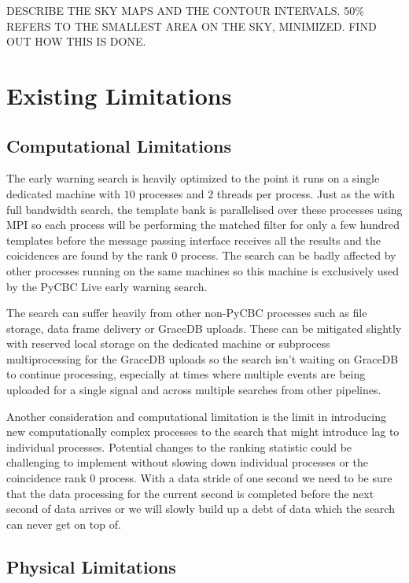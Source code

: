 DESCRIBE THE SKY MAPS AND THE CONTOUR INTERVALS. 50\% REFERS TO THE SMALLEST AREA ON THE SKY, MINIMIZED. FIND OUT HOW THIS IS DONE. 

\section{Existing Limitations}

\subsection{Computational Limitations}

The early warning search is heavily optimized to the point it runs on a single dedicated machine with $10$ processes and $2$ threads per process. Just as the with full bandwidth search, the template bank is parallelised over these processes using MPI so each process will be performing the matched filter for only a few hundred templates before the message passing interface receives all the results and the coicidences are found by the rank 0 process. The search can be badly affected by other processes running on the same machines so this machine is exclusively used by the PyCBC Live early warning search.

The search can suffer heavily from other non-PyCBC processes such as file storage, data frame delivery or GraceDB uploads. These can be mitigated slightly with reserved local storage on the dedicated machine or subprocess multiprocessing for the GraceDB uploads so the search isn't waiting on GraceDB to continue processing, especially at times where multiple events are being uploaded for a single signal and across multiple searches from other pipelines.

Another consideration and computational limitation is the limit in introducing new computationally complex processes to the search that might introduce lag to individual processes. Potential changes to the ranking statistic could be challenging to implement without slowing down individual processes or the coincidence rank 0 process. With a data stride of one second we need to be sure that the data processing for the current second is completed before the next second of data arrives or we will slowly build up a debt of data which the search can never get on top of.

\subsection{Physical Limitations}

